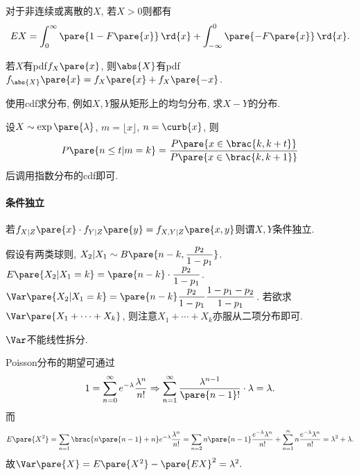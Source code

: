 \documentclass{ctexart}
\begin{document}
对于非连续或离散的$X$, 若$X>0$则都有
\[ EX = \int_0^\infty \pare{1-F\pare{x}}\,\rd{x} + \int_{-\infty}^0 \pare{-F\pare{x}}\,\rd{x}. \]
\par
若$X$有pdf$f_X\pare{x}$, 则$\abs{X}$有pdf$f_{\abs{X}}\pare{x} = f_X\pare{x} + f_X\pare{-x}$.
\par
使用cdf求分布, 例如$X,Y$服从矩形上的均匀分布, 求$X-Y$的分布.
\par
\begin{ex}
    设$X\sim \exp\pare{\lambda}$, $m = \lfloor x \rfloor$, $n = \curb{x}$, 则
    \begin{equation}
        P\pare{n\le t\vert m=k} = \frac{P\pare{x\in\brac{k,k+t}}}{P\pare{x\in \brac{k,k+1}}}
    \end{equation}
    后调用指数分布的cdf即可.
\end{ex}
\paragraph{条件独立} %
\label{par:条件独立}

若$f_{X\vert Z} \pare{x} \cdot f_{Y\vert Z} \pare{y} = f_{X,Y\vert Z}\pare{x,y}$则谓$X,Y$条件独立.


\begin{ex}
    假设有两类球则, $X_2\vert X_1 \sim B\pare{n-k, \displaystyle \frac{p_2}{1-p_1}}$. $E\pare{X_2\vert X_1 = k} = \pare{n-k}\cdot\displaystyle \frac{p_2}{1-p_1}$. $\Var\pare{X_2\vert X_1 = k} = \pare{n-k}\displaystyle \frac{p_2}{1-p_1}\frac{1-p_1-p_2}{1-p_1}$. 若欲求$\Var\pare{X_1+\cdots+X_k}$, 则注意$X_1 + \cdots + X_k$亦服从二项分布即可.
\end{ex}
\begin{pitfall}
    $\Var$不能线性拆分.
\end{pitfall}
Poisson分布的期望可通过
\[ 1 = \sum_{n=0}^\infty e^{-\lambda} \frac{\lambda^n}{n!} \Rightarrow \sum_{n=1}^\infty \frac{\lambda^{n-1}}{\pare{n-1}!}\cdot\lambda = \lambda. \]
而
\[ E\pare{X^2} = \sum_{n=1} \brac{n\pare{n-1}+n} e^{-\lambda} \frac{\lambda^n}{n!} = \sum_{n=2} n\pare{n-1}\frac{e^{-\lambda}\lambda^n}{n!} + \sum_{n=1}^\infty n \frac{e^{-\lambda}\lambda^n}{n!} = \lambda^2 + \lambda. \]
故$\Var\pare{X} = E\pare{X^2} - \pare{EX}^2 = \lambda^2.$
\end{document}
